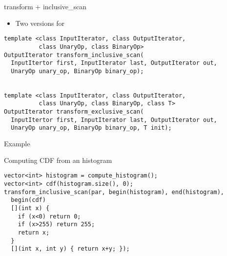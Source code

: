 \begin{frame}[t,fragile]{transform + inclusive\_scan}
\begin{itemize}
  \item Two versions for 
\end{itemize}
\begin{lstlisting}[]
template <class InputIterator, class OutputIterator, 
          class UnaryOp, class BinaryOp>
OutputIterator transform_inclusive_scan(
  InputItertor first, InputIterator last, OutputIterator out, 
  UnaryOp unary_op, BinaryOp binary_op);


template <class InputIterator, class OutputIterator, 
          class UnaryOp, class BinaryOp, class T>
OutputIterator transform_exclusive_scan(
  InputItertor first, InputIterator last, OutputIterator out, 
  UnaryOp unary_op, BinaryOp binary_op, T init);
\end{lstlisting}
\end{frame}

\begin{frame}[t,fragile]{Example}
\begin{block}{Computing CDF from an histogram}
\begin{lstlisting}[]
vector<int> histogram = compute_histogram();
vector<int> cdf(histogram.size(), 0);
transform_inclusive_scan(par, begin(histogram), end(histogram),
  begin(cdf)
  [](int x) {
    if (x<0) return 0;
    if (x>255) return 255;
    return x;
  }
  [](int x, int y) { return x+y; });
\end{lstlisting}
\end{block}
\end{frame}

